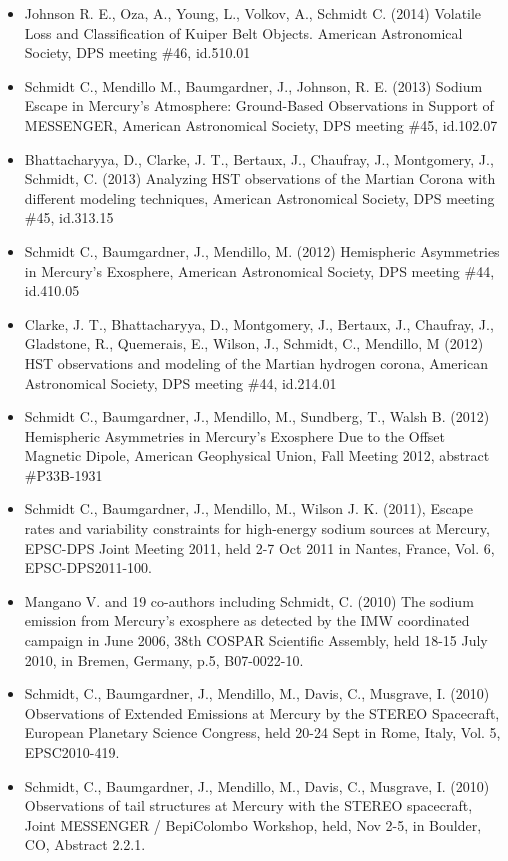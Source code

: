 \documentclass[12pt]{report}
\begin{document}
\begin{itemize}
   \item Johnson R. E., Oza, A., Young, L., Volkov, A., Schmidt C. (2014) Volatile Loss and Classification of Kuiper Belt Objects. American Astronomical Society, DPS meeting \#46, id.510.01
   \item Schmidt C.,  Mendillo M., Baumgardner, J., Johnson, R. E. (2013) Sodium Escape in Mercury's Atmosphere: Ground-Based Observations in Support of MESSENGER, American Astronomical Society, DPS meeting \#45, id.102.07
   \item Bhattacharyya, D., Clarke, J. T., Bertaux, J., Chaufray, J., Montgomery, J., Schmidt, C. (2013) Analyzing HST observations of the Martian Corona with different modeling techniques, American Astronomical Society, DPS meeting \#45, id.313.15
   \item Schmidt C., Baumgardner, J., Mendillo, M. (2012) Hemispheric Asymmetries in Mercury's Exosphere, American Astronomical Society, DPS meeting \#44, id.410.05
   \item Clarke, J. T., Bhattacharyya, D., Montgomery, J., Bertaux, J., Chaufray, J., Gladstone, R., Quemerais, E., Wilson, J., Schmidt, C., Mendillo, M (2012) HST observations and modeling of the Martian hydrogen corona, American Astronomical Society, DPS meeting \#44, id.214.01
   \item Schmidt C., Baumgardner, J., Mendillo, M., Sundberg, T., Walsh B. (2012) Hemispheric Asymmetries in Mercury's Exosphere Due to the Offset Magnetic Dipole, American Geophysical Union, Fall Meeting 2012, abstract \#P33B-1931
   \item Schmidt C., Baumgardner, J., Mendillo, M., Wilson J. K. (2011), Escape rates and variability constraints for high-energy sodium sources at Mercury, EPSC-DPS Joint Meeting 2011, held 2-7 Oct 2011 in Nantes, France, Vol. 6, EPSC-DPS2011-100.
   \item Mangano V. and 19 co-authors including Schmidt, C. (2010) The sodium emission from Mercury's exosphere as detected by the IMW coordinated campaign in June 2006, 38th COSPAR Scientific Assembly, held 18-15 July 2010, in Bremen, Germany, p.5, B07-0022-10. 
   \item Schmidt, C., Baumgardner, J., Mendillo, M., Davis, C., Musgrave, I. (2010) Observations of Extended Emissions at Mercury by the STEREO Spacecraft, European Planetary Science Congress, held 20-24 Sept in Rome, Italy, Vol. 5, EPSC2010-419.
   \item Schmidt, C., Baumgardner, J., Mendillo, M., Davis, C., Musgrave, I. (2010) Observations of tail structures at Mercury with the STEREO spacecraft, Joint MESSENGER / BepiColombo Workshop, held, Nov 2-5, in Boulder, CO, Abstract 2.2.1. 

\end{itemize}
\end{document}
